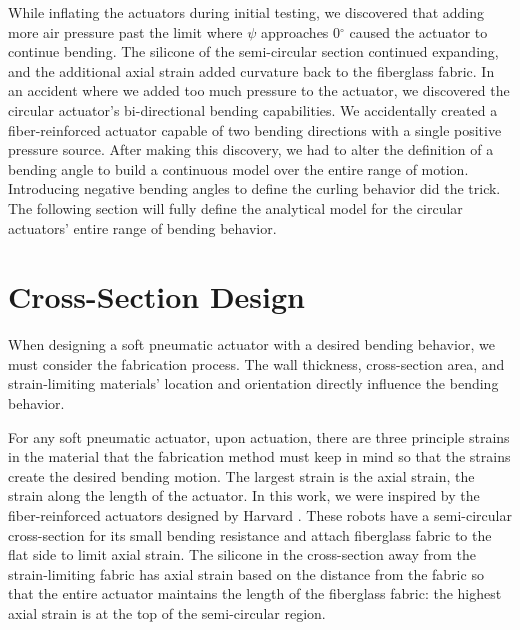 
While inflating the actuators during initial testing, we discovered that adding more air pressure past the limit where $\psi$ approaches 0$^\circ$ caused the actuator to continue bending. The silicone of the semi-circular section continued expanding, and the additional axial strain added curvature back to the fiberglass fabric. In an accident where we added too much pressure to the actuator, we discovered the circular actuator's bi-directional bending capabilities. We accidentally created a fiber-reinforced actuator capable of two bending directions with a single positive pressure source. After making this discovery, we had to alter the definition of a bending angle to build a continuous model over the entire range of motion. Introducing negative bending angles to define the curling behavior did the trick. The following section will fully define the analytical model for the circular actuators' entire range of bending behavior. 

\section{Cross-Section Design}

When designing a soft pneumatic actuator with a desired bending behavior, we must consider the fabrication process. The wall thickness, cross-section area, and strain-limiting materials' location and orientation directly influence the bending behavior. 

For any soft pneumatic actuator, upon actuation, there are three principle strains in the material that the fabrication method must keep in mind so that the strains create the desired bending motion. The largest strain is the axial strain, the strain along the length of the actuator. In this work, we were inspired by the fiber-reinforced actuators designed by Harvard \cite{galloway_mechanically_2013}. These robots have a semi-circular cross-section for its small bending resistance \cite{polygerinos_modeling_2015} and attach fiberglass fabric to the flat side to limit axial strain. The silicone in the cross-section away from the strain-limiting fabric has axial strain based on the distance from the fabric so that the entire actuator maintains the length of the fiberglass fabric: the highest axial strain is at the top of the semi-circular region.  

